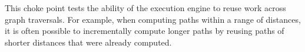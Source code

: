 
This choke point tests the ability of the execution engine to reuse work across
graph traversals. For example, when computing paths within a range of distances,
it is often possible to incrementally compute longer paths by reusing paths of
shorter distances that were already computed.


